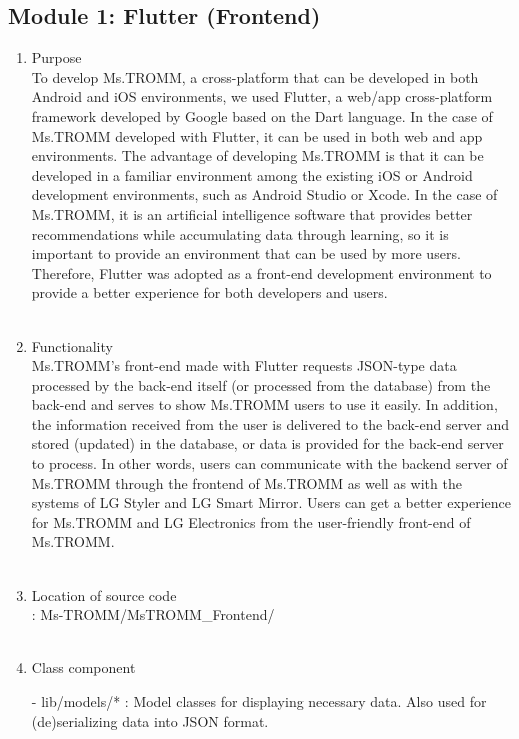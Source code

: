 \documentclass[conference]{IEEEtran}
\begin{document}
\subsection{Module 1: Flutter (Frontend)}
\begin{enumerate}
    \item Purpose\\
    To develop Ms.TROMM, a cross-platform that can be developed in both Android and iOS environments, we used Flutter, a web/app cross-platform framework developed by Google based on the Dart language. In the case of Ms.TROMM developed with Flutter, it can be used in both web and app environments. The advantage of developing Ms.TROMM is that it can be developed in a familiar environment among the existing iOS or Android development environments, such as Android Studio or Xcode. In the case of Ms.TROMM, it is an artificial intelligence software that provides better recommendations while accumulating data through learning, so it is important to provide an environment that can be used by more users. Therefore, Flutter was adopted as a front-end development environment to provide a better experience for both developers and users. \\ \\
    \item Functionality\\
    Ms.TROMM's front-end made with Flutter requests JSON-type data processed by the back-end itself (or processed from the database) from the back-end and serves to show Ms.TROMM users to use it easily. In addition, the information received from the user is delivered to the back-end server and stored (updated) in the database, or data is provided for the back-end server to process. In other words, users can communicate with the backend server of Ms.TROMM through the frontend of Ms.TROMM as well as with the systems of LG Styler and LG Smart Mirror. Users can get a better experience for Ms.TROMM and LG Electronics from the user-friendly front-end of Ms.TROMM. \\ \\
    \item Location of source code\\: Ms-TROMM/MsTROMM\_Frontend/ \\ \\
    \item Class component
        \item[-] lib/models/* : Model classes for displaying necessary data. Also used for (de)serializing data into JSON format. \\

\end{enumerate}
\end{document}
